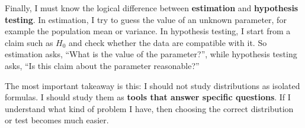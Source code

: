 \documentclass[11pt]{article}
\theoremstyle{smallexample}
\begin{document}
Finally, I must know the logical difference between \textbf{estimation} and \textbf{hypothesis testing}. In estimation, I try to guess the value of an unknown parameter, for example the population mean or variance. In hypothesis testing, I start from a claim such as \(H_0\) and check whether the data are compatible with it. So estimation asks, ``What is the value of the parameter?'', while hypothesis testing asks, ``Is this claim about the parameter reasonable?''

The most important takeaway is this: I should not study distributions as isolated formulas. I should study them as \textbf{tools that answer specific questions}. If I understand what kind of problem I have, then choosing the correct distribution or test becomes much easier.
\end{document}
